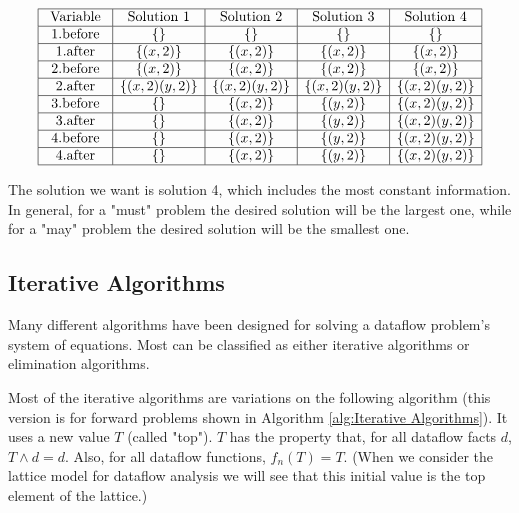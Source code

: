 $$
	\begin{array}{|c|c|c|c|c|}
		\hline \text { Variable }  & \text { Solution 1 } & \text { Solution 2 } & \text { Solution 3 } & \text { Solution 4 } \\
		\hline  \text { 1.before } & \{\}                 & \{\}                 & \{\}                 & \{\}                 \\
		\hline  \text { 1.after }  & \{(x, 2)\}           & \{(x, 2)\}           & \{(x, 2)\}           & \{(x, 2)\}           \\
		\hline  \text { 2.before } & \{(x, 2)\}           & \{(x, 2)\}           & \{(x, 2)\}           & \{(x, 2)\}           \\
		\hline  \text { 2.after }  & \{(x, 2)(y, 2)\}     & \{(x, 2)(y, 2)\}     & \{(x, 2)(y, 2)\}     & \{(x, 2)(y, 2)\}     \\
		\hline  \text { 3.before } & \{\}                 & \{(x, 2)\}           & \{(y, 2)\}           & \{(x, 2)(y, 2)\}     \\
		\hline  \text { 3.after }  & \{\}                 & \{(x, 2)\}           & \{(y, 2)\}           & \{(x, 2)(y, 2)\}     \\
		\hline  \text { 4.before } & \{\}                 & \{(x, 2)\}           & \{(y, 2)\}           & \{(x, 2)(y, 2)\}     \\
		\hline  \text { 4.after }  & \{\}                 & \{(x, 2)\}           & \{(y, 2)\}           & \{(x, 2)(y, 2)\}     \\
		\hline
	\end{array}
$$

The solution we want is solution 4, which includes the most constant
information. In general, for a "must" problem the desired solution will be
the largest one,
while for a "may" problem the desired solution will be the smallest one.


\subsection{Iterative Algorithms}

Many different algorithms have been designed for solving a dataflow
problem's system of equations. Most can be classified as either
iterative algorithms or elimination algorithms.


Most of the iterative algorithms are variations on the following
algorithm (this version is for forward problems shown in Algorithm \ref{alg:Iterative Algorithms}). It uses a new
value $T$ (called "top"). $T$ has the property that, for all dataflow
facts $d$, $T \wedge d = d$. Also, for all dataflow functions, $f_n(T) = T$.
(When we consider the lattice model for dataflow analysis we
will see that this initial value is the top element of the lattice.)







